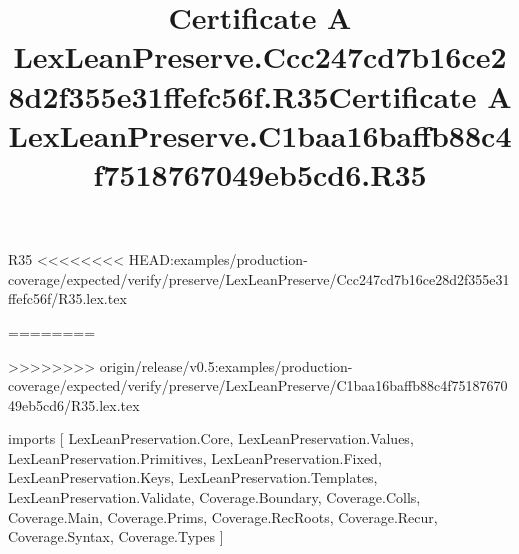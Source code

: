 \begin{lexlean}{R35}
<<<<<<<< HEAD:examples/production-coverage/expected/verify/preserve/LexLeanPreserve/Ccc247cd7b16ce28d2f355e31ffefc56f/R35.lex.tex
\title{Certificate A LexLeanPreserve.Ccc247cd7b16ce28d2f355e31ffefc56f.R35}
========
\title{Certificate A LexLeanPreserve.C1baa16baffb88c4f7518767049eb5cd6.R35}
>>>>>>>> origin/release/v0.5:examples/production-coverage/expected/verify/preserve/LexLeanPreserve/C1baa16baffb88c4f7518767049eb5cd6/R35.lex.tex
\begin{coremodule}
imports [
  LexLeanPreservation.Core,
  LexLeanPreservation.Values,
  LexLeanPreservation.Primitives,
  LexLeanPreservation.Fixed,
  LexLeanPreservation.Keys,
  LexLeanPreservation.Templates,
  LexLeanPreservation.Validate,
  Coverage.Boundary,
  Coverage.Colls,
  Coverage.Main,
  Coverage.Prims,
  Coverage.RecRoots,
  Coverage.Recur,
  Coverage.Syntax,
  Coverage.Types
]


\end{coremodule}
\end{lexlean}
